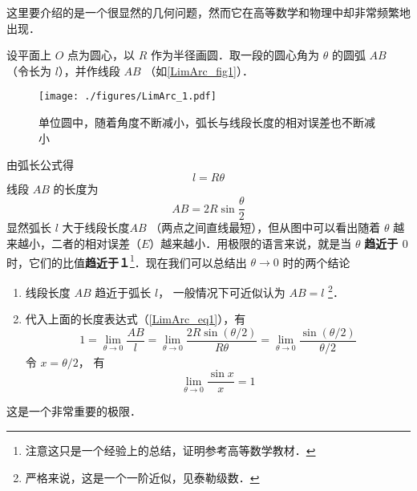 

这里要介绍的是一个很显然的几何问题，然而它在高等数学和物理中却非常频繁地出现．

设平面上 $O$ 点为圆心，以 $R$ 作为半径画圆．取一段的圆心角为 $\theta $ 的圆弧 $AB$ （令长为 $l$），并作线段 $AB$ （如\autoref{LimArc_fig1}）．

\begin{figure}[ht]
\centering
\texttt{[image: ./figures/LimArc\_1.pdf]}
\caption{单位圆中，随着角度不断减小，弧长与线段长度的相对误差也不断减小}\label{LimArc_fig1}
\end{figure}

由弧长公式得
\begin{equation} \label{LimArc_eq1}
l = R\theta 
\end{equation}
线段 $AB$ 的长度为
\begin{equation}\label{LimArc_eq2}
AB = 2R\sin \frac{\theta }{2}
\end{equation}
显然弧长 $l$ 大于线段长度$AB$ （两点之间直线最短），但从图中可以看出随着 $\theta $ 越来越小，二者的相对误差（$E$）越来越小．用极限的语言来说，就是当 $\theta $ \textbf{趋近于 $0$ } 时，它们的比值\textbf{趋近于１}\footnote{注意这只是一个经验上的总结，证明参考高等数学教材．}．现在我们可以总结出 $\theta \to 0$ 时的两个结论

\begin{enumerate}
\item 线段长度 $AB$ 趋近于弧长 $l$， 一般情况下可近似认为 $AB = l$ \footnote{严格来说，这是一个一阶近似，见泰勒级数．}． %

\item 代入上面的长度表达式（\autoref{LimArc_eq1}），有
\begin{equation}
1=\lim_{\theta\to 0} \frac{AB}{l} = \lim_{\theta\to 0} \frac{2R\sin (\theta/2)}{R\theta} 
= \lim_{\theta\to 0}\frac{\sin (\theta/2)}{\theta/2}
\end{equation}
令 $x = \theta/2$， 有
\begin{equation}
\lim_{\theta\to 0} \frac{\sin x}{x} = 1
\end{equation}
\end{enumerate}

这是一个非常重要的极限．










